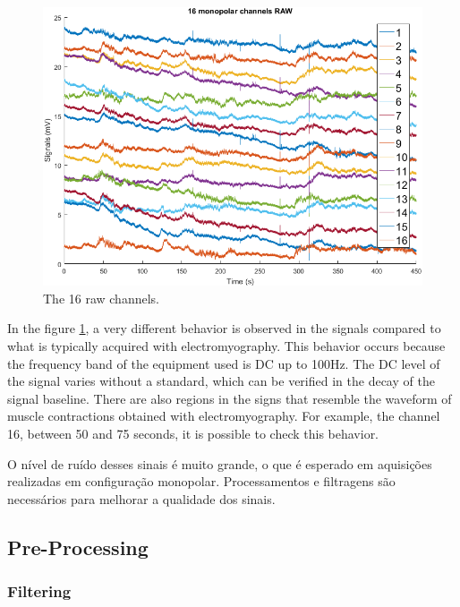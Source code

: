 \documentclass[bioengineering,article,submit,moreauthors,pdftex,10pt,a4paper]{mdpi}
\begin{document}
\begin{figure}[H]
	\caption{\label{monopolar_channels_raw} The 16 raw channels.}
	\begin{center}
		\includegraphics[scale=0.80]{imagens/base2/monopolarChannelsRAW.png} 		
	\end{center}
\end{figure}

In the figure \ref{monopolar_channels_raw}, a very different behavior is observed in the signals compared to what is typically acquired with electromyography. This behavior occurs because the frequency band of the equipment used is DC up to 100Hz. The DC level of the signal varies without a standard, which can be verified in the decay of the signal baseline. There are also regions in the signs that resemble the waveform of muscle contractions obtained with electromyography. For example, the channel 16, between 50 and 75 seconds, it is possible to check this behavior.



O nível de ruído desses sinais é muito grande, o que é esperado em aquisições realizadas em configuração monopolar. Processamentos e filtragens são necessários para melhorar a qualidade dos sinais.

\subsection{Pre-Processing}






\subsubsection{Filtering}
\end{document}
